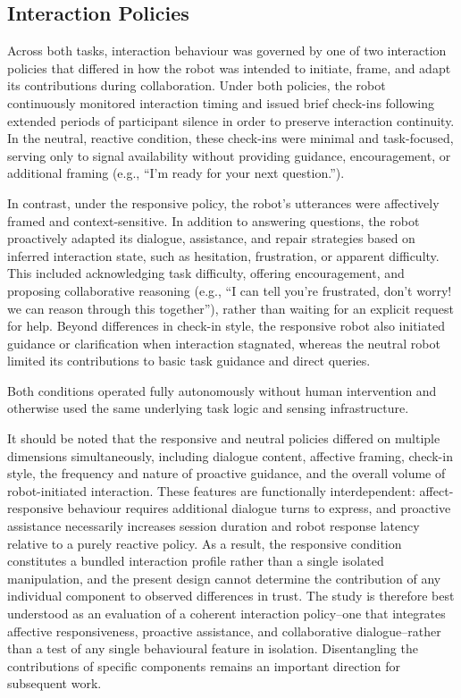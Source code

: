 \documentclass[
  authoryear,
  doubleblind,
  3p]{elsarticle}
\begin{document}
\subsection{Interaction Policies}\label{interaction-policies}

Across both tasks, interaction behaviour was governed by one of two
interaction policies that differed in how the robot was intended to
initiate, frame, and adapt its contributions during collaboration. Under
both policies, the robot continuously monitored interaction timing and
issued brief check-ins following extended periods of participant silence
in order to preserve interaction continuity. In the neutral, reactive
condition, these check-ins were minimal and task-focused, serving only
to signal availability without providing guidance, encouragement, or
additional framing (e.g., ``I'm ready for your next question.'').

In contrast, under the responsive policy, the robot's utterances were
affectively framed and context-sensitive. In addition to answering
questions, the robot proactively adapted its dialogue, assistance, and
repair strategies based on inferred interaction state, such as
hesitation, frustration, or apparent difficulty. This included
acknowledging task difficulty, offering encouragement, and proposing
collaborative reasoning (e.g., ``I can tell you're frustrated, don't
worry! we can reason through this together''), rather than waiting for
an explicit request for help. Beyond differences in check-in style, the
responsive robot also initiated guidance or clarification when
interaction stagnated, whereas the neutral robot limited its
contributions to basic task guidance and direct queries.

Both conditions operated fully autonomously without human intervention
and otherwise used the same underlying task logic and sensing
infrastructure.

It should be noted that the responsive and neutral policies differed on
multiple dimensions simultaneously, including dialogue content,
affective framing, check-in style, the frequency and nature of proactive
guidance, and the overall volume of robot-initiated interaction. These
features are functionally interdependent: affect-responsive behaviour
requires additional dialogue turns to express, and proactive assistance
necessarily increases session duration and robot response latency
relative to a purely reactive policy. As a result, the responsive
condition constitutes a bundled interaction profile rather than a single
isolated manipulation, and the present design cannot determine the
contribution of any individual component to observed differences in
trust. The study is therefore best understood as an evaluation of a
coherent interaction policy--one that integrates affective
responsiveness, proactive assistance, and collaborative dialogue--rather
than a test of any single behavioural feature in isolation.
Disentangling the contributions of specific components remains an
important direction for subsequent work.
\end{document}
